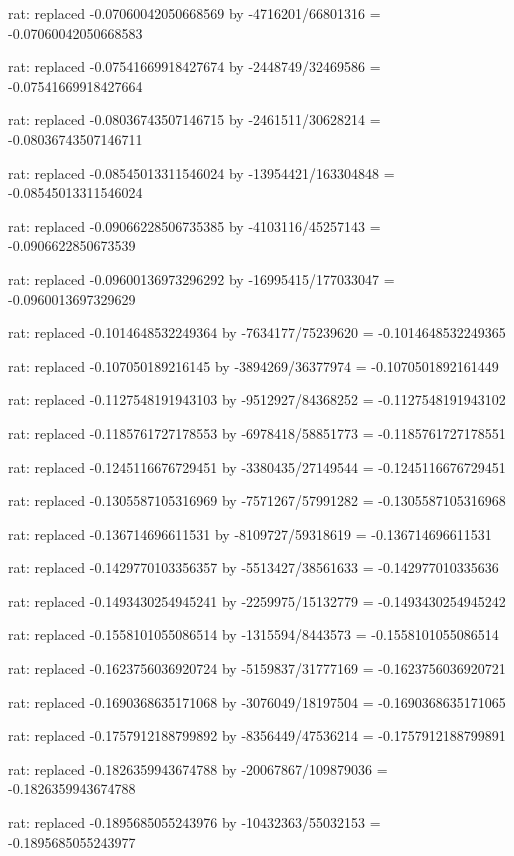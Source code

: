 \documentclass[a4paper,10pt]{article}
\begin{document}
\begin{eulernotebook}
\begin{eulercomment}
\begin{eulercomment}
\begin{eulercomment}
\begin{eulercomment}
\begin{eulercomment}
\begin{eulercomment}
\begin{eulercomment}
\begin{eulercomment}
\begin{eulercomment}
\begin{eulercomment}
\begin{eulercomment}
\begin{eulercomment}
\begin{eulercomment}
\begin{eulercomment}
\begin{eulercomment}
\begin{eulercomment}
\begin{euleroutput}
  rat: replaced -0.07060042050668569 by -4716201/66801316 = -0.07060042050668583
  
  rat: replaced -0.07541669918427674 by -2448749/32469586 = -0.07541669918427664
  
  rat: replaced -0.08036743507146715 by -2461511/30628214 = -0.08036743507146711
  
  rat: replaced -0.08545013311546024 by -13954421/163304848 = -0.08545013311546024
  
  rat: replaced -0.09066228506735385 by -4103116/45257143 = -0.0906622850673539
  
  rat: replaced -0.09600136973296292 by -16995415/177033047 = -0.0960013697329629
  
  rat: replaced -0.1014648532249364 by -7634177/75239620 = -0.1014648532249365
  
  rat: replaced -0.107050189216145 by -3894269/36377974 = -0.1070501892161449
  
  rat: replaced -0.1127548191943103 by -9512927/84368252 = -0.1127548191943102
  
  rat: replaced -0.1185761727178553 by -6978418/58851773 = -0.1185761727178551
  
  rat: replaced -0.1245116676729451 by -3380435/27149544 = -0.1245116676729451
  
  rat: replaced -0.1305587105316969 by -7571267/57991282 = -0.1305587105316968
  
  rat: replaced -0.136714696611531 by -8109727/59318619 = -0.136714696611531
  
  rat: replaced -0.1429770103356357 by -5513427/38561633 = -0.142977010335636
  
  rat: replaced -0.1493430254945241 by -2259975/15132779 = -0.1493430254945242
  
  rat: replaced -0.1558101055086514 by -1315594/8443573 = -0.1558101055086514
  
  rat: replaced -0.1623756036920724 by -5159837/31777169 = -0.1623756036920721
  
  rat: replaced -0.1690368635171068 by -3076049/18197504 = -0.1690368635171065
  
  rat: replaced -0.1757912188799892 by -8356449/47536214 = -0.1757912188799891
  
  rat: replaced -0.1826359943674788 by -20067867/109879036 = -0.1826359943674788
  
  rat: replaced -0.1895685055243976 by -10432363/55032153 = -0.1895685055243977
  

\end{euleroutput}
\end{eulercomment}
\end{eulercomment}
\end{eulercomment}
\end{eulercomment}
\end{eulercomment}
\end{eulercomment}
\end{eulercomment}
\end{eulercomment}
\end{eulercomment}
\end{eulercomment}
\end{eulercomment}
\end{eulercomment}
\end{eulercomment}
\end{eulercomment}
\end{eulercomment}
\end{eulercomment}
\end{eulernotebook}
\end{document}
